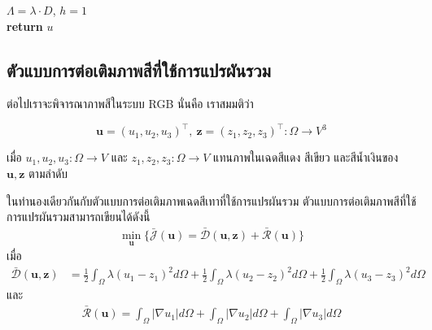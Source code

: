 \documentclass[hidelinks, a4paper,12pt]{article}
\numberwithin{equation}{section}							%
\numberwithin{equation}{section}
\begin{document}
{\begin{itemize}
\begin{algorithm}[H]
{		$\varLambda = \lambda \cdot D $,
		$h = 1$
		 \\
		\textbf{return} $ u $ 
	}
	\end{algorithm}
\end{itemize}

\subsection{ตัวแบบการต่อเติมภาพสีที่ใช้การแปรผันรวม}\label{inpaint-model-color}

\hspace{1cm} ต่อไปเราจะพิจารณาภาพสีในระบบ RGB นั่นคือ เราสมมติว่า

$$ \boldsymbol{u} = (u_1,u_2,u_3)^{\top},\ \boldsymbol{z} = (z_1,z_2,z_3)^{\top} : \Omega  \rightarrow V^3 $$

\noindent เมื่อ $u_1,u_2,u_3: \Omega  \rightarrow V$ และ $z_1,z_2,z_3: \Omega  \rightarrow V$ แทนภาพในเฉดสีแดง สีเขียว และสีน้ำเงินของ $\boldsymbol{u},\boldsymbol{z}$ ตามลำดับ 

\hspace{1cm} ในทำนองเดียวกันกับตัวแบบการต่อเติมภาพเฉดสีเทาที่ใช้การแปรผันรวม ตัวแบบการต่อเติมภาพสีที่ใช้การแปรผันรวมสามารถเขียนได้ดังนี้
\begin{align}
\min_{\boldsymbol{u}} \{ \bar{\mathcal{J}}(\boldsymbol{u})= \mathcal{\bar{D}}(\boldsymbol{u},\boldsymbol{z})+  \mathcal{\bar{R}}(\boldsymbol{u}) \}
\label{e10}
\end{align}
เมื่อ
\begin{align*}
\mathcal{\bar{D}}(\boldsymbol{u},\boldsymbol{z}) 
&= \frac{1}{2}\int_{\Omega}^{}\lambda(u_1 - z_1)^2 d\Omega + \frac{1}{2}\int_{\Omega}^{}\lambda(u_2 - z_2)^2 d\Omega + \frac{1}{2}\int_{\Omega}^{}\lambda(u_3 - z_3)^2 d\Omega
\end{align*}
และ 
\begin{align*}
\mathcal{\bar{R}}(\boldsymbol{u})= \int_{\Omega}^{}\lvert\nabla u_1 \rvert d\Omega + \int_{\Omega}^{}\lvert\nabla u_2 \rvert d\Omega + \int_{\Omega}^{}\lvert\nabla u_3 \rvert d\Omega
\end{align*}

}
\end{document}

